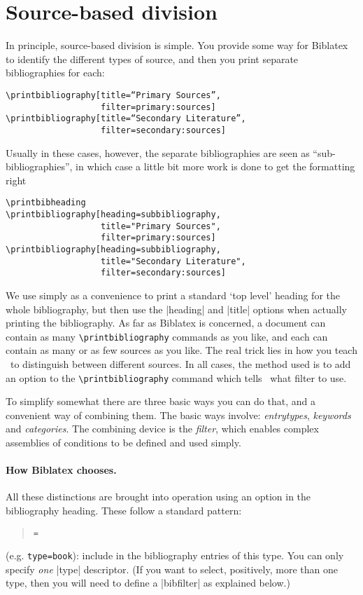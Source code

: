\section{Source-based division}

In principle, source-based division is simple. You provide some way for
Biblatex to identify the different types of source, and then you print
separate bibliographies for each:

\begin{verbatim}
\printbibliography[title=“Primary Sources”,
                   filter=primary:sources]
\printbibliography[title=“Secondary Literature”,
                   filter=secondary:sources]
\end{verbatim}
Usually in these cases, however, the separate bibliographies are seen as
``sub-bibliographies'', in which case a little bit more work is done to
get the formatting right

\begin{verbatim}
\printbibheading
\printbibliography[heading=subbibliography,
                   title="Primary Sources",
                   filter=primary:sources]
\printbibliography[heading=subbibliography,
                   title="Secondary Literature",
                   filter=secondary:sources]
\end{verbatim}
We use  simply as a convenience to print a standard `top level' heading for the whole bibliography, but then use the |heading| and |title| options when actually printing the bibliography. As far as Biblatex is concerned, a document
can contain as many \texttt{\textbackslash{}printbibliography} commands
as you like, and each can contain as many or as few sources as you like.
The real trick lies in how you teach \biblatex\ to distinguish
between different sources. In all cases, the method used is to add an
option to the \texttt{\textbackslash{}printbibliography} command which
tells \biblatex\ what filter to use.

To simplify somewhat there are three basic ways you can do that,
and a convenient way of combining them. The basic ways involve:
\emph{entrytypes}, \emph{keywords} and \emph{categories}. The combining
device is the \emph{filter}, which enables complex assemblies of
conditions to be defined and used simply.

\paragraph{How Biblatex chooses.} All these distinctions are brought
into operation using an option in the bibliography heading. These follow
a standard pattern: 
\begin{quote} 
 \texttt{=} 
\end{quote}
(e.g. \texttt{type=book}): include in the bibliography entries of this
type. You can only specify \emph{one} |type| descriptor. (If you want to select, positively, more than one type, then you will need to define a |bibfilter| as explained below.)

